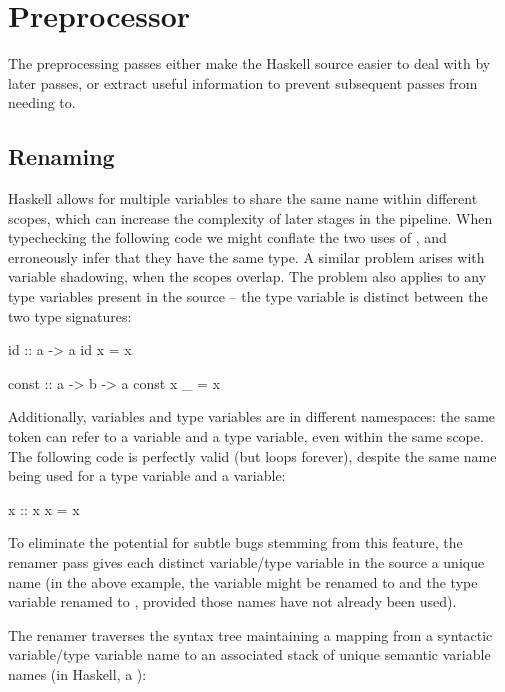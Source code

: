 \documentclass[dissertation.tex]{subfiles}
\begin{document}
\section{Preprocessor}
{
    The preprocessing passes either make the Haskell source easier to deal with by later passes, or extract useful information to prevent subsequent passes from needing to.

    \subsection{Renaming}
    {
        Haskell allows for multiple variables to share the same name within different scopes, which can increase the complexity of later stages in the pipeline. When typechecking the following code we might conflate the two uses of , and erroneously infer that they have the same type. A similar problem arises with variable shadowing, when the scopes overlap. The problem also applies to any type variables present in the source -- the type variable  is distinct between the two type signatures:

        \begin{haskellfigure}
        id :: a -> a
        id x = x

        const :: a -> b -> a
        const x _ = x
        \end{haskellfigure}

        Additionally, variables and type variables are in different namespaces: the same token can refer to a variable and a type variable, even within the same scope. The following code is perfectly valid (but loops forever), despite the same name being used for a type variable and a variable:

        \begin{haskellfigure}
        x :: x
        x = x
        \end{haskellfigure}

        To eliminate the potential for subtle bugs stemming from this feature, the renamer pass gives each distinct variable/type variable in the source a unique name (in the above example, the variable  might be renamed to  and the type variable renamed to , provided those names have not already been used).
        
        The renamer traverses the syntax tree maintaining a mapping from a syntactic variable/type variable name to an associated stack of unique semantic variable names (in Haskell, a ):

}}
\end{document}
